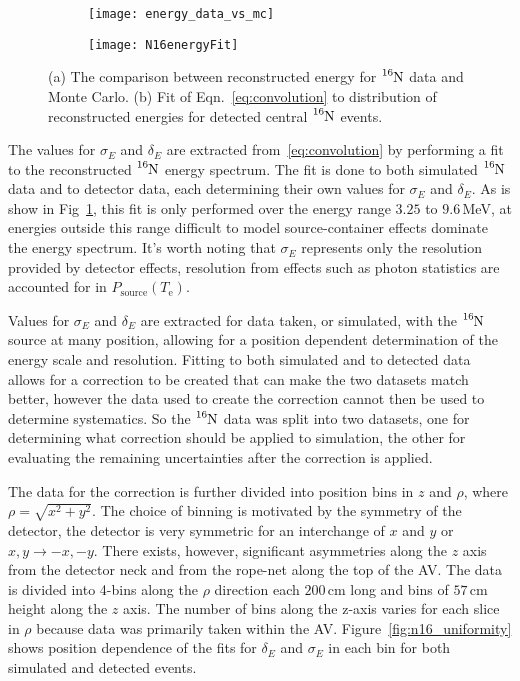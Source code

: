 \begin{figure}[htbp]
\centering
\begin{subfigure}{0.48\textwidth}
\centering
\texttt{[image: energy\_data\_vs\_mc]}
\caption[]{}
\end{subfigure}
\hfill
\begin{subfigure}{0.48\textwidth}
\centering
\texttt{[image: N16energyFit]}
\caption[]{}
\end{subfigure}
\caption[$\ce{^{16}N}$ Energy Comparisons]{ (a) The comparison between
reconstructed energy for $\ce{^{16}N}$ data and Monte Carlo.  (b) Fit of
Eqn.~\eqref{eq:convolution} to distribution of reconstructed energies for
detected central $\ce{^{16}N}$ events.}
\label{fig:n16_energy}
\end{figure}
The values for $\sigma_{E}$ and $\delta_{E}$ are extracted from~\eqref{eq:convolution}
by performing a fit to the reconstructed $\ce{^{16}N}$ energy spectrum.
The fit is done to both simulated $\ce{^{16}N}$ data and to detector data,
each determining their own values for $\sigma_{E}$ and $\delta_{E}$.
As is show in Fig~\ref{fig:n16_energy}, this fit is only performed
over the energy range $3.25$ to $9.6$\,MeV, at energies outside this range
difficult to model source-container effects dominate the energy spectrum.
It's worth noting that $\sigma_{E}$ represents only the resolution provided by detector
effects, resolution from effects such as photon statistics are accounted
for in $P_\mathrm{source}(T_{\mathrm{e}})$.

Values for $\sigma_{E}$ and $\delta_{E}$ are extracted for data taken, or simulated, with
the $\ce{^{16}N}$ source at many position, allowing for a position dependent
determination of the energy scale and resolution.
Fitting to both simulated and to detected data allows for a correction to
be created that can make the two datasets match better, however the data
used to create the correction cannot then be used to determine systematics.
So the $\ce{^{16}N}$ data was split into two datasets, one for determining
what correction should be applied to simulation, the other for evaluating
the remaining uncertainties after the correction is applied.

The data for the correction is further divided into position bins in $z$ and
$\rho$, where $\rho = \sqrt{x^{2} + y^{2}}$. The choice of binning is motivated
by the symmetry of the detector, the detector is very symmetric for an interchange
of $x$ and $y$ or $x,y \rightarrow -x,-y$.
There exists, however, significant asymmetries along the $z$ axis
from the detector neck and from the rope-net along the top of the AV\@.
The data is divided into 4-bins along the $\rho$ direction each $200$\,cm long
and bins of $57$\,cm height along the $z$ axis. The number of bins along the
z-axis varies for each slice in $\rho$ because data was primarily taken within
the AV.\@
Figure~\ref{fig:n16_uniformity} shows position dependence of the fits for
$\delta_{E}$ and $\sigma_{E}$ in each bin for both simulated and detected
events.

